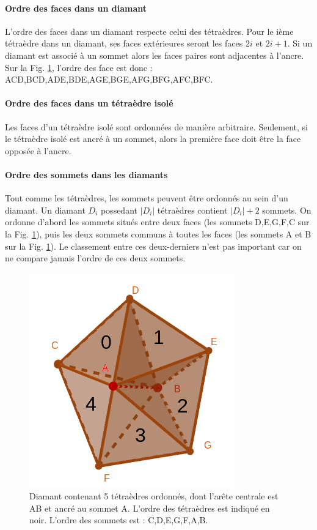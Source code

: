 \paragraph{Ordre des faces dans un diamant}
L'ordre des faces dans un diamant respecte celui des tétraèdres. Pour le ième tétraèdre dans un diamant, ses faces extérieures seront les faces $2i$ et $2i+1$. Si un diamant est associé à un sommet alors les faces paires sont adjacentes à l'ancre. Sur la Fig. \ref{fig:tetra_ordonnee}, l'ordre des face est donc : ACD,BCD,ADE,BDE,AGE,BGE,AFG,BFG,AFC,BFC.
\paragraph{Ordre des faces dans un tétraèdre isolé}
Les faces d'un tétraèdre isolé sont ordonnées de manière arbitraire. Seulement, si le tétraèdre isolé est ancré à un sommet, alors la première face doit être la face opposée à l'ancre.
\paragraph{Ordre des sommets dans les diamants}
\label{Ordre des sommets dans les diamants}Tout comme les tétraèdres, les sommets peuvent être ordonnés au sein d'un diamant. Un diamant $D_i$ possedant $|D_i|$ tétraèdres contient $|D_i|+2$ sommets. On ordonne d'abord les sommets situés entre deux faces (les sommets D,E,G,F,C sur la Fig. \ref{fig:tetra_ordonnee}), puis les deux sommets communs à toutes les faces (les sommets A et B sur la Fig. \ref{fig:tetra_ordonnee}). Le classement entre ces deux-derniers n'est pas important car on ne compare jamais l'ordre de ces deux sommets.
\begin{figure}[th]
\begin{center}
\includegraphics[scale=0.45]{Images/tetra_ordonnee}
\caption{Diamant contenant 5 tétraèdres ordonnés, dont l'arête centrale est AB et ancré au sommet A. L'ordre des tétraèdres est indiqué en noir. L'ordre des sommets est : C,D,E,G,F,A,B.}
\label{fig:tetra_ordonnee}
\end{center}
\end{figure}
\noindent
